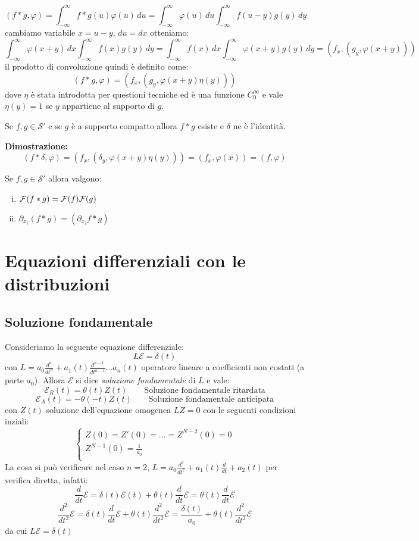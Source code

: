 \[(f*g,\varphi) = \int_{-\infty}^\infty f*g(u)\varphi(u)\,du = \int_{-\infty}^\infty\varphi(u)\,du  \int_{-\infty}^\infty f(u-y)g(y)\,dy \]
cambiamo variabile $x = u-y$, $du = dx$ otteniamo:
\[\int_{-\infty}^\infty\varphi(x+y)\,dx  \int_{-\infty}^\infty f(x)g(y)\,dy  =  \int_{-\infty}^\infty f(x)\,dx  \int_{-\infty}^\infty \varphi(x+y)g(y)\,dy = (f_x,(g_y,\varphi(x+y))) \]
il prodotto di convoluzione quindi è definito come:
\[(f*g,\varphi) = (f_x,(g_y,\varphi(x+y)\eta(y)))\]
dove $\eta$ è stata introdotta per questioni tecniche ed è una funzione $C_0^\infty$ e vale $\eta(y)=1$ se $y$ appartiene al supporto di $g$.
\begin{thm}
Se $f,g\in\mathcal{S}'$ e se $g$ è a supporto compatto allora $f*g$ esiste e $\delta$ ne è l'identità.
\end{thm}
\hspace{-1.4em}\textbf{Dimostrazione:}\\
\[(f*\delta,\varphi) = (f_x,(\delta_y,\varphi(x+y)\eta(y))) = (f_x,\varphi(x)) = (f,\varphi)\]
\begin{thm}
Se $f,g\in\mathcal{S}'$  allora valgono:
\begin{enumerate}[i.]
\item $\mathcal{F}(f*g) = \mathcal{F}(f)\mathcal{F}(g)$
\item $\partial_{x_i}(f*g) = (\partial_{x_i}f*g)$
\end{enumerate}
\end{thm}
\section{Equazioni differenziali con le distribuzioni}
\subsection{Soluzione fondamentale}
Consideriamo la seguente equazione differenziale:
\[L\mathcal{E} =\delta(t)\]
con $L = a_0\frac{d^n}{dt^n}+a_1(t)\frac{d^{n-1}}{dt^{n-1}}\dots a_n(t)$ operatore lineare a coefficienti non costati (a parte $a_0$). Allora $\mathcal{E}$ si dice \emph{soluzione fondamentale} di $L$ e vale:
\[\mathcal{E}_R(t) = \theta(t)Z(t)\qquad \text{Soluzione fondamentale ritardata}\]
\[\mathcal{E}_A(t) = -\theta(-t)Z(t)\qquad \text{Soluzione fondamentale anticipata}\]
con $Z(t)$ soluzione dell'equazione omogenea $LZ=0$ con le seguenti condizioni inziali:
\[\begin{cases}
    Z(0)=Z'(0)=\dots=Z^{N-2}(0) = 0\\
   Z^{N-1}(0)=\frac{1}{a_0}\\
  \end{cases} \]
La cosa si può verificare nel caso $n=2$, $L=a_0\frac{d^2}{dt^2}+a_1(t)\frac{d}{dt}+a_2(t)$ per verifica diretta, infatti:
\[\frac{d}{dt}\mathcal{E} = \delta(t)\mathcal{E}(t)+\theta(t)\frac{d}{dt}\mathcal{E} = \theta(t)\frac{d}{dt}\mathcal{E}\]
\[\frac{d^2}{dt^2}\mathcal{E} = \delta(t)\frac{d}{dt}\mathcal{E} + \theta(t)\frac{d^2}{dt^2}\mathcal{E} = \frac{\delta(t)}{a_0} + \theta(t)\frac{d^2}{dt^2}\mathcal{E}\]
da cui $L\mathcal{E} = \delta(t)$
